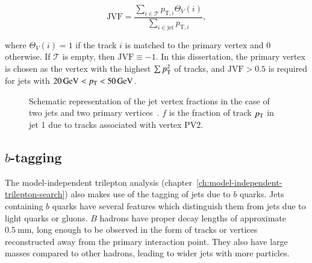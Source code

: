 \begin{equation}\label{eqn:jvf}
	\mathrm{JVF}=\frac{\sum_{i\in\mathcal{T}} p_{\mathrm{T},i} \Theta_V(i)} {\sum_{i\in\mathrm{jet}} p_{\mathrm{T},i} },
\end{equation}

where $\Theta_V(i)=1$ if the track $i$ is matched to the primary vertex and $0$ otherwise. If $\mathcal{T}$ is empty, then $\mathrm{JVF}\equiv -1$. In this dissertation, the primary vertex is chosen as the vertex with the highest $\sum p_{\text{T}}^2$ of tracks, and $\mathrm{JVF}>0.5$ is required for jets with $\SI{20}{\giga\electronvolt}<p_{\text{T}}<\SI{50}{\giga\electronvolt}$. 

\begin{figure}[htbp]
	\centering
	\caption{Schematic representation of the jet vertex fractions in the case of two jets and two primary vertices~\cite{TheATLASCollaboration:2013vb}. $f$ is the fraction of track $p_{\text{T}}$ in jet 1 due to tracks associated with vertex PV2.}
	\label{fig:jvf-cartoon}
\end{figure}


\subsection{$b$-tagging}\label{sec:reco-bjets}
The model-independent trilepton analysis (chapter~\ref{ch:model-independent-trilepton-search}) also makes use of the tagging of jets due to $b$ quarks. Jets containing $b$ quarks have several features which distinguish them from jets due to light quarks or gluons. $B$ hadrons have proper decay lengths of approximate $\SI{0.5}{\milli\meter}$, long enough to be observed in the form of tracks or vertices reconstructed away from the primary interaction point. They also have large masses compared to other hadrons, leading to wider jets with more particles. 

